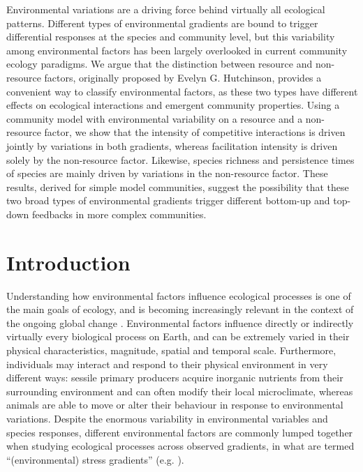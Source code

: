 Environmental variations are a driving force behind virtually all ecological patterns. Different types of environmental gradients are bound to trigger differential responses at the species and community level, but this variability among environmental factors has been largely overlooked in current community ecology paradigms. We argue that the distinction between resource and non-resource factors, originally proposed by Evelyn G. Hutchinson, provides a convenient way to classify environmental factors, as these two types have different effects on ecological interactions and emergent community properties. Using a community model with environmental variability on a resource and a non-resource factor, we show that the intensity of competitive interactions is driven jointly by variations in both gradients, whereas facilitation intensity is driven solely by the non-resource factor. Likewise, species richness and persistence times of species are mainly driven by variations in the non-resource factor. These results, derived for simple model communities, suggest the possibility that these two broad types of environmental gradients trigger different bottom-up and top-down feedbacks in more complex communities.

\section{Introduction}

Understanding how environmental factors influence ecological processes is one of the main goals of ecology, and is becoming increasingly relevant in the context of the ongoing global change \citep{Vitousek1994}. Environmental factors influence directly or indirectly virtually every biological process on Earth, and can be extremely varied in their physical characteristics, magnitude, spatial and temporal scale. Furthermore, individuals may interact and respond to their physical environment in very different ways: sessile primary producers acquire inorganic nutrients from their surrounding environment and can often modify their local microclimate, whereas animals are able to move or alter their behaviour in response to environmental variations. Despite the enormous variability in environmental variables and species responses, different environmental factors are commonly lumped together when studying ecological processes across observed gradients, in what are termed “(environmental) stress gradients” (e.g. \citealt{Hart2013}).

